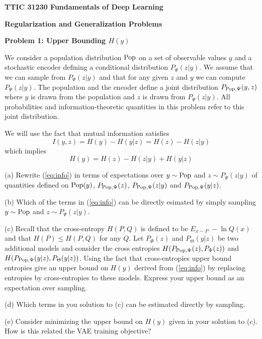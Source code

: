 \documentclass{article}
\newcommand{\solution}[1]{}
\begin{document}
\centerline{\bf TTIC 31230 Fundamentals of Deep Learning}
\bigskip
\centerline{\bf Regularization and  Generalization Problems}

\bigskip
\bigskip


\bigskip

{\bf Problem 1: Upper Bounding $H(y)$}

\medskip
We consider a population distribution $\mathrm{Pop}$ on a set of observable values $y$ and a stochastic encoder defining a conditional distribution $P_\Psi(z|y)$.
We assume that we can sample from $P_\Psi(z|y)$ and that for any given $z$ and $y$ we can compute $P_\Psi(z|y)$.
The population and the encoder define a joint distribution $P_{\mathrm{Pop},\Psi}(y,z)$ where $y$ is drawn from the population and $z$ is drawn from $P_\Psi(z|y)$.
All probabilities and information-theoretic quantities in this problem refer to this joint distribution.

\vfill
We will use the fact that mutual information satisfies
$$I(y,z) = H(y) - H(y|z) = H(z)- H(z|y)$$
which implies
\begin{equation}
  \label{eq:info}
H(y) = H(z) - H(z|y) + H(y|z)
\end{equation}

\medskip
(a) Rewrite (\ref{eq:info}) in terms of expectations over $y \sim \mathrm{Pop}$ and $z \sim P_\Psi(z|y)$ of quantities defined on $\mathrm{Pop}(y)$, $P_{\mathrm{Pop},\Psi}(z)$, $P_{\mathrm{Pop},\Psi}(z|y)$ and $P_{\mathrm{Pop},\Psi}(y|z)$.

\solution{
  $$E_{y \sim \pop} \; -\ln\;\pop(y) = E_{y \sim \pop,\;z \sim P_\Psi(z|y)}\;\; - \ln P_{\Psi}(z) + \ln P_{\pop,\Psi}(z|y) - \ln P_{\pop,\Psi}(y|z)$$
}

\medskip
(b) Which of the terms in (\ref{eq:info}) can be directly esimated by simply sampling $y \sim \mathrm{Pop}$ and $z \sim P_\Psi(z|y)$.

\solution{
  Just the middle term $H(z|y)$.}

\medskip

(c) Recall that the cross-entropy $H(P,Q)$ is defined to be $E_{x \sim P} \;-\ln Q(x)$ and that $H(P) \leq H(P,Q)$ for any $Q$.
Let $P_\Phi(z)$ and $P_\Theta(y|z)$ be two additional models and consider the cross entropies $H(P_{\mathrm{Pop},\Psi}(z),P_\Phi(z))$ and $H(P_{\mathrm{Pop},\Psi}(y|z),P_\Theta(y|z))$.
Using the fact that cross-entropies upper bound entropies give an upper bound on $H(y)$ derived from (\ref{eq:info}) by replacing entropies by cross-entropies to these models.
Express your upper bound as an expectation over sampling.

\solution{
  $$H(y) \leq  E_{y \sim \pop,\;z \sim P_\Psi(z|y)}\;\; - \ln P_\Phi(z)\; \;+ \ln P_{\Psi}(z|y)\; - \ln P_{\Theta}(y|z)$$}


\medskip
(d) Which terms in you solution to (c) can be estimated directly by sampling.

\solution{All}

\medskip
(e) Consider minimizing the upper bound on $H(y)$ given in your solution to (c).  How is this related the VAE training objective?

\solution{It is exactly the same.}
\end{document}
